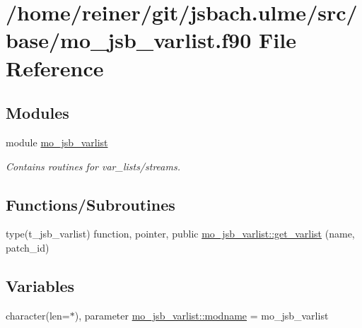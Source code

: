 \hypertarget{mo__jsb__varlist_8f90}{}\section{/home/reiner/git/jsbach.ulme/src/base/mo\+\_\+jsb\+\_\+varlist.f90 File Reference}
\label{mo__jsb__varlist_8f90}
\subsection*{Modules}
\begin{DoxyCompactItemize}
\item 
module \hyperlink{namespacemo__jsb__varlist}{mo\+\_\+jsb\+\_\+varlist}
\begin{DoxyCompactList}\small\item\em Contains routines for var\+\_\+lists/streams. \end{DoxyCompactList}\end{DoxyCompactItemize}
\subsection*{Functions/\+Subroutines}
\begin{DoxyCompactItemize}
\item 
type(t\+\_\+jsb\+\_\+varlist) function, pointer, public \hyperlink{namespacemo__jsb__varlist_adb20739c60013ec241ba5044f198ce74}{mo\+\_\+jsb\+\_\+varlist\+::get\+\_\+varlist} (name, patch\+\_\+id)
\end{DoxyCompactItemize}
\subsection*{Variables}
\begin{DoxyCompactItemize}
\item 
character(len=$\ast$), parameter \hyperlink{namespacemo__jsb__varlist_a5689561f18201663129fe99f0badd5cf}{mo\+\_\+jsb\+\_\+varlist\+::modname} = \textquotesingle{}mo\+\_\+jsb\+\_\+varlist\textquotesingle{}
\end{DoxyCompactItemize}
